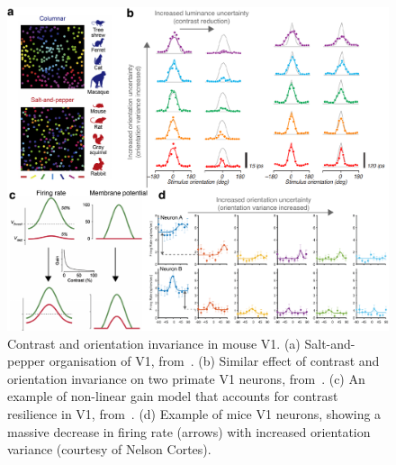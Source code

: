 \begin{figure}[h!tbp]
\vspace{0.1cm}
\centering
\includegraphics[width=1.\textwidth]{fig/fig_chap8_mouse_mc.pdf}
\caption[Contrast and orientation invariance in mouse\gls{V1}.]{Contrast and orientation invariance in mouse \gls{V1}. (a) Salt-and-pepper organisation of \gls{V1}, from~\cite{jang2020retino}. (b) Similar effect of contrast and orientation invariance on two primate \gls{V1} neurons, from~\cite{goris2015origin}. (c) An example of non-linear gain model that accounts for contrast resilience in \gls{V1}, from~\cite{finn2007emergence}. (d) Example of mice \gls{V1} neurons, showing a massive decrease in firing rate (arrows) with increased orientation variance (courtesy of Nelson Cortes). }
\label{fig_chap8_mouse_mc}
\end{figure} %


